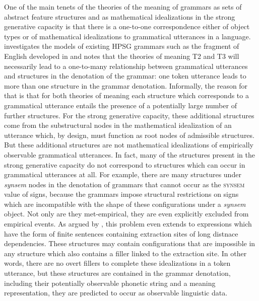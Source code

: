 \documentclass[output=paper
                ,modfonts
                ,nonflat
	        ,collection
	        ,collectionchapter
	        ,collectiontoclongg
 	        ,biblatex
                ,babelshorthands
                ,newtxmath
                ,draftmode
                ,colorlinks, citecolor=brown
]{./langsci/langscibook}
\begin{document}
{One of the main tenets of the theories of the meaning of grammars as
sets of abstract feature structures and as mathematical idealizations
in the strong generative capacity is that there is a one-to-one
correspondence either of object types or of mathematical idealizations
to grammatical utterances in a language. \citet{Richter2007a}
investigates the models of existing HPSG grammars such as the fragment
of English developed in \cite{PollardSag1994} and notes that the
theories of meaning T2 and T3 will necessarily lead to a one-to-many
relationship between grammatical utterances and structures in the
denotation of the grammar: one token utterance leads to more than one
structure in the grammar denotation. Informally, the reason for that
is that for both theories of meaning each structure which corresponds
to a grammatical utterance entails the presence of a potentially large
number of further structures. For the strong generative capacity,
these additional structures come from the substructural nodes in the
mathematical idealization of an utterance which, by design, must
function as root nodes of admissible structures. But these additional
structures are not mathematical idealizations of empirically
observable grammatical utterances. In fact, many of the structures
present in the strong generative capacity do not correspond to
structures which can occur in grammatical utterances at all. For
example, there are many structures under \textit{synsem} nodes in the
denotation of grammars that cannot occur as the \textsc{synsem} value
of signs, because the grammars impose structural restrictions on signs
which are incompatible with the shape of these configurations under a
\textit{synsem} object. Not only are they met-empirical, they are even
explicitly excluded from empirical events. As argued by
\citet{Richter2007a}, this problem even extends to expressions which
have the form of finite sentences containing extraction sites of long
distnace dependencies. These structures may contain configurations
that are impossible in any structure which also contains a filler
linked to the extraction site. In other words, there are no overt
fillers to complete these idealizations in a token utterance, but
these structures are contained
in the grammar denotation, including their potentially observable
phonetic string and a meaning representation, they are predicted to occur
as observable linguistic data.

}
\end{document}
